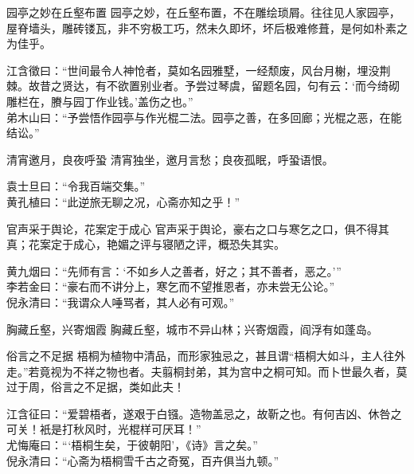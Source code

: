 \begin{yulu}{园亭之妙在丘壑布置}
园亭之妙，在丘壑布置，不在雕绘琐屑。往往见人家园亭，屋脊墙头，雕砖镂瓦，非不穷极工巧，然未久即坏，坏后极难修葺，是何如朴素之为佳乎。
\begin{comments}
江含徵曰：“世间最令人神怆者，莫如名园雅墅，一经颓废，风台月榭，埋没荆棘。故昔之贤达，有不欲置别业者。予尝过琴虞，留题名园，句有云：‘而今绮砌雕栏在，賸与园丁作业钱。’盖伤之也。” \\
弟木山曰：“予尝悟作园亭与作光棍二法。园亭之善，在多回廊；光棍之恶，在能结讼。”
\end{comments}
\end{yulu}

\begin{yulu}{清宵邀月，良夜呼蛩}
清宵独坐，邀月言愁；良夜孤眠，呼蛩语恨。
\begin{comments}
袁士旦曰：“令我百端交集。” \\
黄孔植曰：“此逆旅无聊之况，心斋亦知之乎！”
\end{comments}
\end{yulu}

\begin{yulu}{官声采于舆论，花案定于成心}
官声采于舆论，豪右之口与寒乞之口，俱不得其真；花案定于成心，艳媚之评与寝陋之评，概恐失其实。
\begin{comments}
黄九烟曰：“先师有言：‘不如乡人之善者，好之；其不善者，恶之。’” \\
李若金曰：“豪右而不讲分上，寒乞而不望推恩者，亦未尝无公论。” \\
倪永清曰：“我谓众人唾骂者，其人必有可观。”
\end{comments}
\end{yulu}

\begin{yulu}{胸藏丘壑，兴寄烟霞}
胸藏丘壑，城市不异山林；兴寄烟霞，阎浮有如蓬岛。
\begin{comments}

\end{comments}
\end{yulu}

\begin{yulu}{俗言之不足据}
梧桐为植物中清品，而形家独忌之，甚且谓“梧桐大如斗，主人往外走。”若竟视为不祥之物也者。夫翦桐封弟，其为宫中之桐可知。而卜世最久者，莫过于周，俗言之不足据，类如此夫！
\begin{comments}
江含征曰：“爱碧梧者，遂艰于白镪。造物盖忌之，故靳之也。有何吉凶、休咎之可关！衹是打秋风时，光棍样可厌耳！” \\
尤悔庵曰：“‘梧桐生矣，于彼朝阳’，《诗》言之矣。” \\
倪永清曰：“心斋为梧桐雪千古之奇冤，百卉俱当九顿。”
\end{comments}
\end{yulu}

